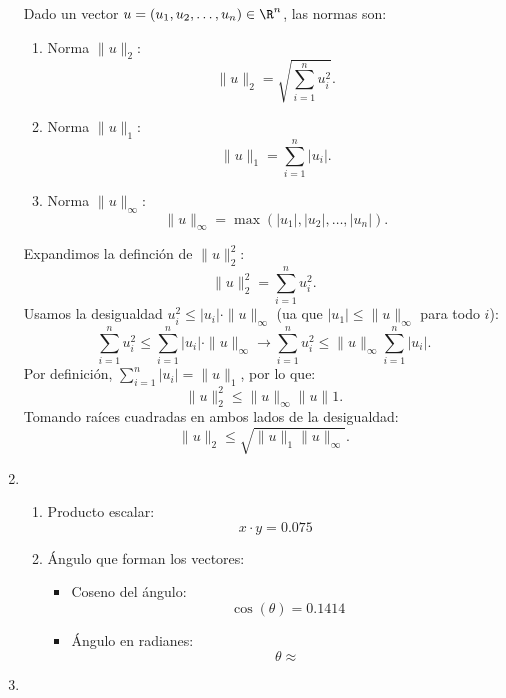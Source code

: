 \begin{enumerate}[label=\color{red}\textbf{\arabic*)}]
    Dado un vector $u=(u_1,u_2,\dots,u_n)\in \R^n$, las normas son: 
    \begin{enumerate}[label=\arabic*)]
        \item Norma $\|u\|_2$:  \[
        \|u\|_2=\sqrt{\sum_{i=1}^{n} u_i^2} .
        \] 
    \item Norma $\|u\|_1$:  \[
    \|u\|_1=\sum_{i=1}^{n} |u_i|.
    \] 
\item Norma $\|u\|_\infty$: \[
\|u\|_\infty=\max(|u_1|,|u_2|,\dots,|u_n|).
\] 
    \end{enumerate}
    Expandimos la definción de $\|u\|_2^2$: \[
    \|u\|_2^2=\sum_{i=1}^{n} u_i^2.
    \] 
    Usamos la desigualdad $u_i^2\le |u_i|\cdot \|u\|_\infty$ (ua que $|u_1|\le \|u\|_{\infty}$ para todo $i$): \[
    \sum_{i=1}^{n} u_i^2\le  \sum_{i=1}^{n} |u_i|\cdot \|u\|_\infty\longrightarrow \sum_{i=1}^{n} u_i^2\le \|u\|_\infty \sum_{i=1}^{n} |u_i|.
    \] 
    Por definición, $\sum_{i=1}^{n} |u_i|=\|u\|_1$, por lo que: \[
    \|u\|_2^2\le \|u\|_\infty\|u\|1.
    \] 
Tomando raíces cuadradas en ambos lados de la desigualdad: \[
\|u\|_2\le \sqrt{\|u\|_1\|u\|_\infty}. 
\] 
\item {}

    \begin{enumerate}[label=\arabic*)]
        \item  Producto escalar: \[
        x\cdot y=0.075
        \] 
    \item Ángulo que forman los vectores:
        \begin{itemize}[label=\textbullet]
            \item Coseno del ángulo: \[
            \cos(\theta)=0.1414
            \] 
        \item Ángulo en radianes: \[
        \theta \approx 
        \] 
        \end{itemize}
    \end{enumerate}
\item {}


\end{enumerate}
